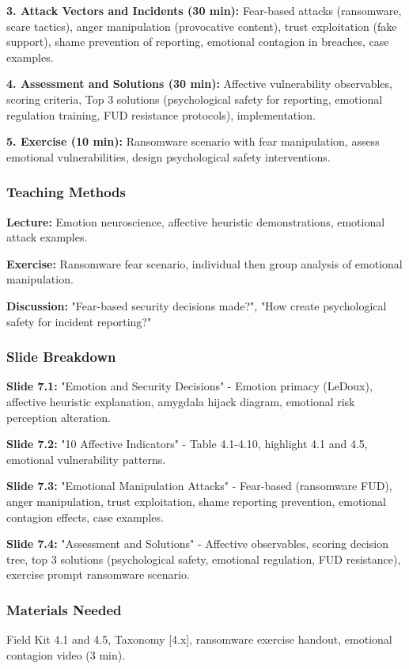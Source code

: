 \documentclass[11pt,a4paper]{article}
\begin{document}
\textbf{3. Attack Vectors and Incidents (30 min):} Fear-based attacks (ransomware, scare tactics), anger manipulation (provocative content), trust exploitation (fake support), shame prevention of reporting, emotional contagion in breaches, case examples.

\textbf{4. Assessment and Solutions (30 min):} Affective vulnerability observables, scoring criteria, Top 3 solutions (psychological safety for reporting, emotional regulation training, FUD resistance protocols), implementation.

\textbf{5. Exercise (10 min):} Ransomware scenario with fear manipulation, assess emotional vulnerabilities, design psychological safety interventions.

\subsubsection{Teaching Methods}
\textbf{Lecture:} Emotion neuroscience, affective heuristic demonstrations, emotional attack examples.

\textbf{Exercise:} Ransomware fear scenario, individual then group analysis of emotional manipulation.

\textbf{Discussion:} "Fear-based security decisions made?", "How create psychological safety for incident reporting?"

\subsubsection{Slide Breakdown}
\textbf{Slide 7.1:} "Emotion and Security Decisions" - Emotion primacy (LeDoux), affective heuristic explanation, amygdala hijack diagram, emotional risk perception alteration.

\textbf{Slide 7.2:} "10 Affective Indicators" - Table 4.1-4.10, highlight 4.1 and 4.5, emotional vulnerability patterns.

\textbf{Slide 7.3:} "Emotional Manipulation Attacks" - Fear-based (ransomware FUD), anger manipulation, trust exploitation, shame reporting prevention, emotional contagion effects, case examples.

\textbf{Slide 7.4:} "Assessment and Solutions" - Affective observables, scoring decision tree, top 3 solutions (psychological safety, emotional regulation, FUD resistance), exercise prompt ransomware scenario.

\subsubsection{Materials Needed}
Field Kit 4.1 and 4.5, Taxonomy [4.x], ransomware exercise handout, emotional contagion video (3 min).
\end{document}
